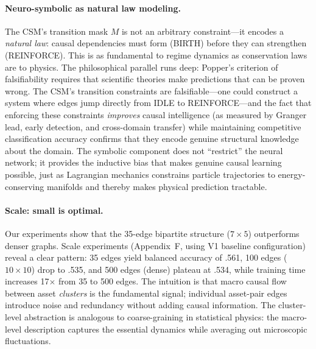 \documentclass[11pt]{article}
\begin{document}
\paragraph{Neuro-symbolic as natural law modeling.} The CSM's transition mask $M$ is not an arbitrary constraint---it encodes a \emph{natural law}: causal dependencies must form (BIRTH) before they can strengthen (REINFORCE). This is as fundamental to regime dynamics as conservation laws are to physics. The philosophical parallel runs deep: Popper's criterion of falsifiability requires that scientific theories make predictions that can be proven wrong. The CSM's transition constraints are falsifiable---one could construct a system where edges jump directly from IDLE to REINFORCE---and the fact that enforcing these constraints \emph{improves} causal intelligence (as measured by Granger lead, early detection, and cross-domain transfer) while maintaining competitive classification accuracy confirms that they encode genuine structural knowledge about the domain. The symbolic component does not ``restrict'' the neural network; it provides the inductive bias that makes genuine causal learning possible, just as Lagrangian mechanics constrains particle trajectories to energy-conserving manifolds and thereby makes physical prediction tractable.

\paragraph{Scale: small is optimal.} Our experiments show that the 35-edge bipartite structure ($7 \times 5$) outperforms denser graphs. Scale experiments (Appendix~F, using V1 baseline configuration) reveal a clear pattern: 35 edges yield balanced accuracy of .561, 100 edges ($10 \times 10$) drop to .535, and 500 edges (dense) plateau at .534, while training time increases 17$\times$ from 35 to 500 edges. The intuition is that macro causal flow between asset \emph{clusters} is the fundamental signal; individual asset-pair edges introduce noise and redundancy without adding causal information. The cluster-level abstraction is analogous to coarse-graining in statistical physics: the macro-level description captures the essential dynamics while averaging out microscopic fluctuations.
\end{document}
